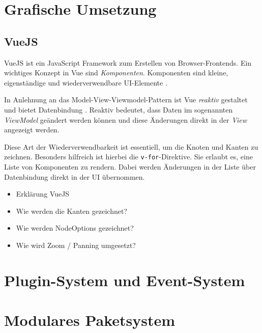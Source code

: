 \todo{}

\section{Grafische Umsetzung}

\subsection{VueJS}
VueJS ist ein JavaScript Framework zum Erstellen von Browser-Frontends. Ein wichtiges Konzept in Vue sind \textit{Komponenten}. Komponenten sind kleine, eigenständige und wiederverwendbare UI-Elemente \cite{vue:components}.

In Anlehnung an das Model-View-Viewmodel-Pattern ist Vue \textit{reaktiv} gestaltet und bietet Datenbindung \cite{vue:instance}. Reaktiv bedeutet, dass Daten im sogenannten \textit{ViewModel} geändert werden können und diese Änderungen direkt in der \textit{View} angezeigt werden. 

Diese Art der Wiederverwendbarkeit ist essentiell, um die Knoten und Kanten zu zeichnen. Besonders hilfreich ist hierbei die \texttt{v-for}-Direktive. Sie erlaubt es, eine Liste von Komponenten zu rendern. Dabei werden Änderungen in der Liste über Datenbindung direkt in der UI übernommen. 



\begin{itemize}
    \item Erklärung VueJS
    \item Wie werden die Kanten gezeichnet?
    \item Wie werden NodeOptions gezeichnet?
    \item Wie wird Zoom / Panning umgesetzt?
\end{itemize}

\section{Plugin-System und Event-System}

\section{Modulares Paketsystem}


